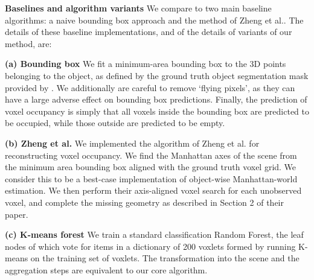 \documentclass[10pt,twocolumn,letterpaper]{article}
\makeatletter
\newcommand*{\ea}{et al.\@\xspace}
\renewcommand{\paragraph}{\vspace{2pt}\noindent\textbf}
\makeatother
\begin{document}



\paragraph{Baselines and algorithm variants}
\label{sec:algorithms}
We compare to two main baseline algorithms: a naive bounding box approach and the method of Zheng \ea \cite{zheng-cvpr-2013}.
The details of these baseline implementations, and of the details of variants of our method, are:

\noindent \textbf{(a) Bounding box} We fit a minimum-area bounding box to the 3D points belonging to the object, as defined by the ground truth object segmentation mask provided by \cite{singh-icra-2014}.
We additionally are careful to remove `flying pixels', as they can have a large adverse effect on bounding box predictions.
Finally, the prediction of voxel occupancy is simply that all voxels inside the bounding box are predicted to be occupied, while those outside are predicted to be empty.

\noindent \textbf{(b) Zheng \ea} \cite{zheng-cvpr-2013}
We implemented the algorithm of Zheng \ea \cite{zheng-cvpr-2013} for reconstructing voxel occupancy.
We find the Manhattan axes of the scene from the minimum area bounding box aligned with the ground truth voxel grid. 
We consider this to be a best-case implementation of object-wise Manhattan-world estimation.
We then perform their axis-aligned voxel search for each unobserved voxel, and complete the missing geometry as described in Section 2 of their paper.


\noindent \textbf{(c) K-means forest} We train a standard classification Random Forest, the leaf nodes of which vote for items in a dictionary of 200 voxlets formed by running K-means on the training set of voxlets. The transformation into the scene and the aggregation steps are equivalent to our core algorithm.
\end{document}
